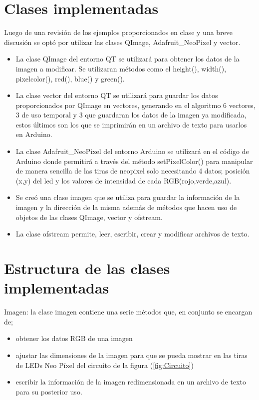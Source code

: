 \documentclass{article}
\begin{document}
	\section{Clases implementadas} \label{Clases}
	Luego de una revisión de los ejemplos proporcionados en clase y una breve discusión se optó por utilizar las clases QImage, Adafruit\_NeoPixel y vector.
	
	\begin{itemize}
	    \item La clase QImage del entorno QT se utilizará para obtener los datos de la imagen a modificar. Se utilizaran métodos como el height(), width(), pixelcolor(), red(), blue() y green().
	    \item La clase vector del entorno QT se utilizará para guardar los datos proporcionados por QImage en vectores, generando en el algoritmo 6 vectores, 3 de uso temporal y 3 que guardaran los datos de la imagen ya modificada, estos últimos son los que se imprimirán en un archivo de texto para usarlos en Arduino.
	    \item 	La clase Adafruit\_NeoPixel del entorno Arduino se utilizará en el código de Arduino donde permitirá a través del método setPixelColor() para manipular de manera sencilla de las tiras de neopixel solo necesitando 4 datos; posición (x,y) del led y los valores de intensidad de cada RGB(rojo,verde,azul).
	    \item Se creó una clase imagen que se utiliza para guardar la información de la imagen y la dirección de la misma además de métodos que hacen uso de objetos de las clases QImage, vector y ofstream.
	    \item La clase ofstream permite, leer, escribir, crear y modificar archivos de texto.
	\end{itemize}
	
	\section{Estructura de las clases implementadas}
	Imagen: la clase imagen contiene una serie métodos que, en conjunto se encargan de;
	\begin{itemize}
	    \item obtener los datos RGB de una imagen
	    \item ajustar las dimensiones de la imagen para que se pueda mostrar en las tiras de LEDs Neo Píxel del circuito de la figura (\ref{fig:Circuito})
	    \item escribir la información de la imagen redimensionada en un archivo de texto para su posterior uso.
	\end{itemize}
	
\end{document}
